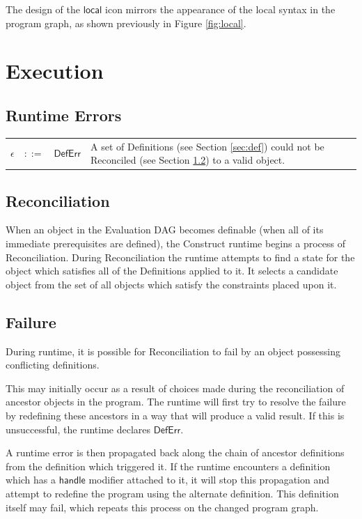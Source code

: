 \documentclass[twoside,openright,11pt]{report}
\begin{document}
The design of the $\mathsf{local}$ icon mirrors the appearance of the local syntax in the program graph, as shown previously in Figure \ref{fig:local}.


\chapter{Execution}
\label{chap:exec}

\section{Runtime Errors}
\label{sec:runtime-errors}

\begin{tabularx}{\textwidth}{l l l X}
$\epsilon$ & $::=$ & $\mathsf{DefErr}$ & A set of Definitions (see Section \ref{sec:def}) could not be Reconciled (see Section \ref{sec:reconc}) to a valid object.
\end{tabularx}

\section{Reconciliation}
\label{sec:reconc}

When an object in the Evaluation DAG becomes definable (when all of its immediate prerequisites are defined), the Construct runtime begins a process of Reconciliation. 
During Reconciliation the runtime attempts to find a state for the object which satisfies all of the Definitions applied to it. 
It selects a candidate object from the set of all objects which satisfy the constraints placed upon it.

\section{Failure}
\label{sec:failure}

During runtime, it is possible for Reconciliation to fail by an object possessing conflicting definitions. 

This may initially occur as a result of choices made during the reconciliation of ancestor objects in the program. 
The runtime will first try to resolve the failure by redefining these ancestors in a way that will produce a valid result. 
If this is unsuccessful, the runtime declares $\mathsf{DefErr}$.

A runtime error is then propagated back along the chain of ancestor definitions from the definition which triggered it. 
If the runtime encounters a definition which has a $\mathsf{handle}$ modifier attached to it, it will stop this propagation and attempt to redefine the program using the alternate definition.
This definition itself may fail, which repeats this process on the changed program graph.
\end{document}
